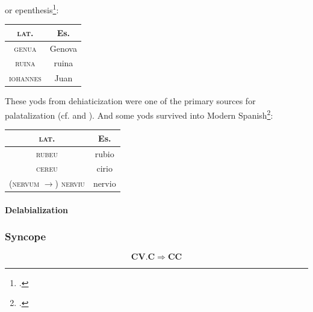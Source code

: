 \documentclass{report}[12pt]
\begin{document}
or epenthesis\footcite[p.~57-58]{romance_his}:
\begin{center}
  \begin{tabular}{c c}
    \textsc{lat.} & Es. \\
    \hline
    \textsc{genua} & Genova \\
    \textsc{ruina} & ruina \\
    \textsc{iohannes} & Juan \\
  \end{tabular}
\end{center}
These yods from dehiaticization were one of the primary sources for palatalization (cf.  and ). And some yods survived into Modern Spanish\footcite[p.~134]{lloyd_spanish}:
\begin{center}
  \begin{tabular}{c c}
    \textsc{lat.} & Es. \\
    \hline
    \textsc{rubeu} & rubio \\
    \textsc{cereu} & cirio \\
    (\textsc{nervum} $\rightarrow$) \textsc{nerviu} & nervio \\
  \end{tabular}
\end{center}

\paragraph{Delabialization}

\subsubsection{Syncope}

\begin{tcolorbox}
  \[ \textbf{C}\textbf{V}.\textbf{C} \Rightarrow \textbf{C}\textbf{C} \]
\end{tcolorbox}
\end{document}
